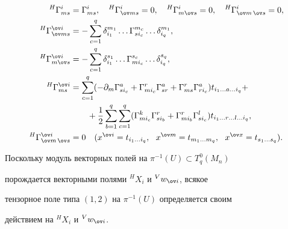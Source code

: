 \begin{align*}


{}^H\Gamma^i_{ms}&=\Gamma^i_{ms},\quad


{}^H\Gamma^i_{\ov ms}=0,\quad {}^H\Gamma^i_{m\ov s}=0,\quad


{}^H\Gamma^i_{\ov m\,\ov s}=0, \\


%


{}^H\Gamma^{{\ov i}}_{\ov ms}&=-\sum^q_{c=1}


\delta^{m_1}_{i_1}\dotsc \Gamma^{m_c}_{si_c}\dotsc


\delta^{m_1}_{i_q}, \\


%


{}^H\Gamma^{{\ov i}}_{m\ov s}&=-\sum^q_{c=1}


\delta^{s_1}_{i_1}\dotsc \Gamma^{s_c}_{mi_c}\dotsc


\delta^{s_q}_{i_q}, \\


%


{}^H\Gamma^{{\ov i}}_{ms}&=\sum^q_{c=1}(-\partial_m


\Gamma^a_{si_c}+\Gamma^r_{mi_c}\Gamma^a_{sr}+


\Gamma^r_{ms}\Gamma^a_{ri_c})


t_{i_1\dotsc a\dotsc i_q} + \\
%


&\qquad +\frac{1}{2}\sum^q_{b=1}\sum^q_{c=1}


(\Gamma^k_{mi_c}\Gamma^r_{si_b}+


\Gamma^r_{mi_b}\Gamma^l_{si_c})


t_{i_1\dotsc r\dotsc l\dotsc i_q}, \\
%


{}^H\Gamma^{{\ov i}}_{\ov m\,\ov s}&=0\quad


(x^{{\ov i}}=t_{i_1\dotsc i_q},\ \ x^{\ov m}=


t_{m_1\dotsc m_q},\ \ x^{\ov x}=t_{s_1\dotsc s_q}).


\end{align*}





Поскольку модуль векторных полей на $\pi^{-1}(U)\subset T^0_q(M_n)$


порождается векторными полями ${}^HX_i$ и ${}^Vw_{{\ov i}}$, всякое


тензорное поле типа $(1,2)$ на $\pi^{-1}(U)$ определяется своим


действием  на ${}^HX_i$ и ${}^Vw_{{\ov i}}$.


